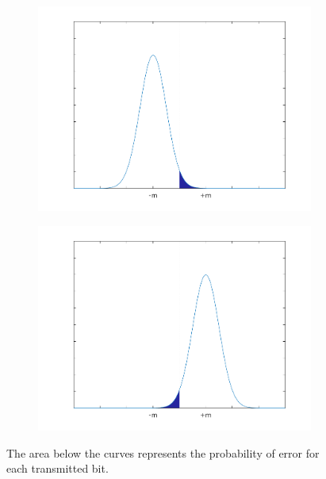 \begin{figure}[H]
	\centering
	\begin{subfigure}{.5\textwidth}
		\centering
		\includegraphics[clip, trim=1cm 0cm 1cm 0cm,width=\textwidth]{./sdf/m_qam_system/figures/gaussian_error_2.pdf}
	\end{subfigure}%
	\begin{subfigure}{.5\textwidth}
		\centering
		\includegraphics[clip, trim=1cm 0cm 1cm 0cm,width=\textwidth]{./sdf/m_qam_system/figures/gaussian_error.pdf}
	\end{subfigure}
	\caption{The area below the curves represents the probability of error for each transmitted bit.}
	\label{fig:gausserr}
\end{figure}

